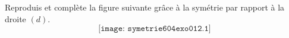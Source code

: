 Reproduis et complète la figure suivante grâce à la symétrie par rapport à la droite $(d)$.
\[\texttt{[image: symetrie604exo012.1]}\]